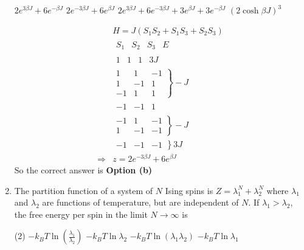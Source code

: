 \begin{enumerate}
\begin{tasks}
		\task[\textbf{a.}] $2 e^{3 \beta J}+6 e^{-\beta J}$
		\task[\textbf{b.}] $2 e^{-3 \beta J}+6 e^{\beta J}$
		\task[\textbf{c.}]$2 e^{3 \beta J}+6 e^{-3 \beta J}+3 e^{\beta J}+3 e^{-\beta J}$
		\task[\textbf{d.}] $(2 \cosh \beta J)^{3}$
	\end{tasks}
	\begin{answer}
		\begin{align*}
		&H=J\left(S_{1} S_{2}+S_{1} S_{3}+S_{2} S_{3}\right)\\
		&\begin{array}{llll}
		S_{1} & S_{2} & S_{3} & E
		\end{array}\\
		&\begin{array}{llll}
		1 & 1 & 1 & 3 J
		\end{array}\\
		&\left.\begin{array}{ccc}
		1 & 1 & -1 \\
		1 & -1 & 1 \\
		-1 & 1 & 1
		\end{array}\right\}-J\\
		&\begin{array}{lll}
		-1 & -1 & 1
		\end{array}\\
		&\left.\begin{array}{ccc}
		-1 & 1 & -1 \\
		1 & -1 & -1
		\end{array}\right\}-J\\
		&\left.\begin{array}{lll}
		-1 & -1 & -1
		\end{array}\right\} 3 J\\
		\Rightarrow&z=2 e^{-3 \beta J}+6 e^{\beta J}
		\end{align*}
		So the correct answer is \textbf{Option (b)}
	\end{answer}
	\item The partition function of a system of $N$ Ising spins is $Z=\lambda_{1}^{N}+\lambda_{2}^{N}$ where $\lambda_{1}$ and $\lambda_{2}$ are functions of temperature, but are independent of $N$. If $\lambda_{1}>\lambda_{2}$, the free energy per spin in the limit $N \rightarrow \infty$ is
	{	}
	\begin{tasks}(2)
		\task[\textbf{a.}]$-k_{B} T \ln \left(\frac{\lambda_{1}}{\lambda_{2}}\right)$
		\task[\textbf{b.}] $-k_{B} T \ln \lambda_{2}$
		\task[\textbf{c.}]$-k_{B} T \ln \left(\lambda_{1} \lambda_{2}\right)$
		\task[\textbf{d.}] $-k_{B} T \ln \lambda_{1}$

\end{tasks}
\end{enumerate}
